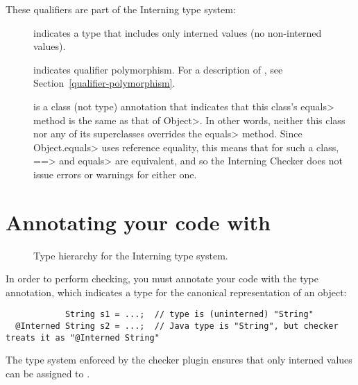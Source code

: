 These qualifiers are part of the Interning type system:

\begin{description}

\item[]
  indicates a type that includes only interned values (no non-interned
  values).

\item[]
  indicates qualifier polymorphism.  For a description of
  , see
  Section~\ref{qualifier-polymorphism}.

\item[]
  is a class (not type) annotation that indicates that this class's
  \<equals> method is the same as that of \<Object>.  In other words,
  neither this class nor any of its superclasses overrides the \<equals>
  method.  Since \<Object.equals> uses reference equality, this means that
  for such a class, \<==> and \<equals> are equivalent, and so the
  Interning Checker does not issue errors or warnings for either one.

\end{description}


\section{Annotating your code with \label{annotating-with-interned}}

\begin{figure}
\caption{Type hierarchy for the Interning type system.}
\label{fig-interning-hierarchy}
\end{figure}

In order to perform checking, you must annotate your code with the 
type annotation, which indicates a type for the canonical representation of an
object:

\begin{Verbatim}
            String s1 = ...;  // type is (uninterned) "String"
  @Interned String s2 = ...;  // Java type is "String", but checker treats it as "@Interned String"
\end{Verbatim}

The type system enforced by the checker plugin ensures that only interned
values can be assigned to .

